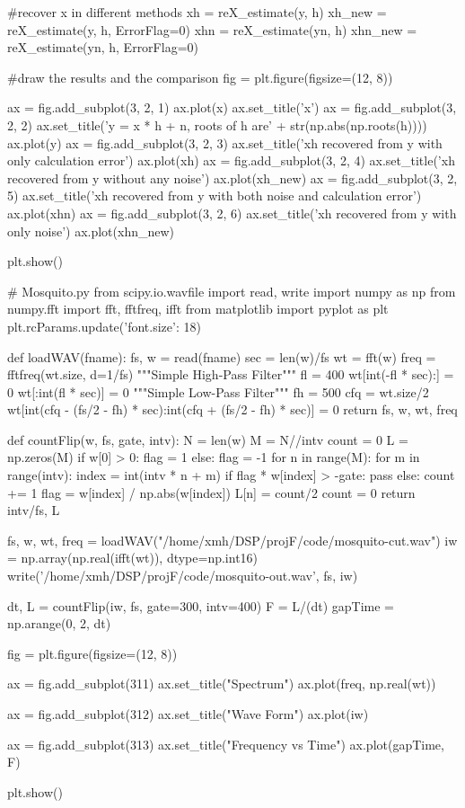 \documentclass{article}
\begin{document}
\begin{appendices}
\begin{python}
#recover x in different methods
xh = reX_estimate(y, h)
xh_new = reX_estimate(y, h, ErrorFlag=0)
xhn = reX_estimate(yn, h)
xhn_new = reX_estimate(yn, h, ErrorFlag=0)

#draw the results and the comparison
fig = plt.figure(figsize=(12, 8))

ax = fig.add_subplot(3, 2, 1)
ax.plot(x)
ax.set_title('x')
ax = fig.add_subplot(3, 2, 2)
ax.set_title('y = x * h + n, roots of h are' + str(np.abs(np.roots(h))))
ax.plot(y)
ax = fig.add_subplot(3, 2, 3)
ax.set_title('xh recovered from y with only calculation error')
ax.plot(xh)
ax = fig.add_subplot(3, 2, 4)
ax.set_title('xh recovered from y without any noise')
ax.plot(xh_new)
ax = fig.add_subplot(3, 2, 5)
ax.set_title('xh recovered from y with both noise and calculation error')
ax.plot(xhn)
ax = fig.add_subplot(3, 2, 6)
ax.set_title('xh recovered from y with only noise')
ax.plot(xhn_new)

plt.show()

\end{python}

\begin{python}
# Mosquito.py
from scipy.io.wavfile import read, write
import numpy as np
from numpy.fft import fft, fftfreq, ifft
from matplotlib import pyplot as plt
plt.rcParams.update({'font.size': 18})

def loadWAV(fname):
    fs, w = read(fname)
    sec = len(w)/fs
    wt = fft(w)
    freq = fftfreq(wt.size, d=1/fs)
    """Simple High-Pass Filter"""
    fl = 400
    wt[int(-fl * sec):] = 0
    wt[:int(fl * sec)] = 0
    """Simple Low-Pass Filter"""
    fh = 500
    cfq = wt.size/2
    wt[int(cfq - (fs/2 - fh) * sec):int(cfq + (fs/2 - fh) * sec)] = 0
    return fs, w, wt, freq

def countFlip(w, fs, gate, intv):
    N = len(w)
    M = N//intv
    count = 0
    L = np.zeros(M)
    if w[0] > 0:
        flag = 1
    else:
        flag = -1
    for n in range(M):
        for m in range(intv):
            index = int(intv * n + m)
            if flag * w[index] > -gate:
                pass
            else:
                count += 1
                flag = w[index] / np.abs(w[index])
        L[n] = count/2
        count = 0
    return intv/fs, L

fs, w, wt, freq = loadWAV("/home/xmh/DSP/projF/code/mosquito-cut.wav")
iw = np.array(np.real(ifft(wt)), dtype=np.int16)
write('/home/xmh/DSP/projF/code/mosquito-out.wav', fs, iw)

dt, L = countFlip(iw, fs, gate=300, intv=400)
F = L/(dt)
gapTime = np.arange(0, 2, dt)

fig = plt.figure(figsize=(12, 8))

ax = fig.add_subplot(311)
ax.set_title("Spectrum")
ax.plot(freq, np.real(wt))

ax = fig.add_subplot(312)
ax.set_title("Wave Form")
ax.plot(iw)

ax = fig.add_subplot(313)
ax.set_title("Frequency vs Time")
ax.plot(gapTime, F)

plt.show()
\end{python}

\end{appendices}
\end{document}
